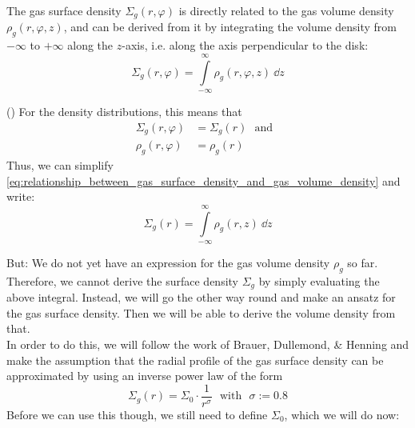         The gas surface density $\Sigma_g(r,\varphi)$ is directly related to the gas volume density
        $\rho_g(r,\varphi,z)$, and can be derived from it by integrating the volume density from 
        $-\infty$ to $+\infty$ along the $z$-axis, i.e. along the axis perpendicular to the disk:
        \begin{equation}
            \label{eq:relationship_between_gas_surface_density_and_gas_volume_density}
            \Sigma_g(r,\varphi)
                = \int\limits_{-\infty}^{\infty} \rho_g(r,\varphi,z)\ \dd z
        \end{equation}

         ()
        For the density distributions, this means that
        \begin{align}
            \Sigma_g(r, \varphi) 
                &= \Sigma_g(r) 
            \ \ \ \text{and}\ \ \
            \\
            \rho_g(r, \varphi) 
                &= \rho_g(r)
        \end{align}
        Thus, we can simplify 
        \cref{eq:relationship_between_gas_surface_density_and_gas_volume_density} and write:
        \begin{equation}
            \Sigma_g(r)
                = \int\limits_{-\infty}^{\infty} \rho_g(r,z)\ \dd z
        \end{equation}
        
        But: We do not yet have an expression for the gas volume density $\rho_g$ so far.
        Therefore, we cannot derive the surface density $\Sigma_g$ by simply evaluating the above
        integral. Instead, we will go the other way round and make an ansatz for the gas surface
        density. Then we will be able to derive the volume density from that. \\

        In order to do this, we will 
        follow the work of Brauer, Dullemond, \& Henning \cite{brauer_dullemond_henning_2007}
        and make the assumption that the radial profile of the gas surface density can be 
        approximated by using an inverse power law of the form
        \begin{equation}
            \label{eq:gas_surface_density_profile_inverse_power_law_ansatz}
            \Sigma_g(r) = \Sigma_0\cdot\frac{1}{r^\sigma}
            \ \ \ \text{with}\ \ \
            \sigma := 0.8
        \end{equation}  %
        Before we can use this though, we still need to define $\Sigma_0$, which we will do now: \\

